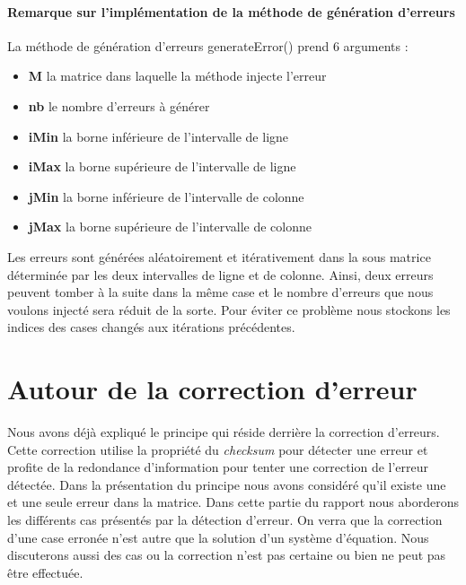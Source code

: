 \documentclass[a4paper, 10pt]{report}
\begin{document}
\subsubsection{Remarque  sur l’implémentation de la méthode de génération d’erreurs }
La méthode de génération d’erreurs generateError() prend 6 arguments :
\begin{itemize}
 \item \textbf{M} la matrice dans laquelle la méthode injecte l'erreur
 \item \textbf{nb} le nombre d'erreurs à générer
 \item \textbf{iMin} la borne inférieure de l'intervalle de ligne
 \item \textbf{iMax} la borne supérieure de l'intervalle de ligne
 \item \textbf{jMin} la borne inférieure de l'intervalle de colonne
 \item \textbf{jMax} la borne supérieure de l'intervalle de colonne
\end{itemize}
Les erreurs sont générées aléatoirement et itérativement dans la sous matrice déterminée par les deux intervalles de 
ligne et de colonne. Ainsi, deux erreurs peuvent tomber à la suite dans la même case et le nombre d’erreurs que nous 
voulons injecté sera réduit de la sorte. Pour éviter ce problème nous stockons les indices des cases changés aux 
itérations précédentes.

\chapter{Autour de la correction d'erreur}
Nous avons déjà expliqué le principe qui réside derrière la correction d’erreurs. Cette correction utilise la propriété 
du \textit{checksum} pour détecter une erreur et profite de la redondance d’information pour tenter une correction de 
l’erreur détectée. Dans la présentation du principe nous avons considéré qu’il existe une et une seule erreur dans la matrice. 
Dans cette partie du rapport nous aborderons les différents cas présentés par la détection d’erreur. On verra que la 
correction d’une case erronée n’est autre que la solution d’un système d’équation. Nous discuterons aussi des cas ou 
la correction n’est pas certaine ou bien ne peut pas être effectuée.
\end{document}
